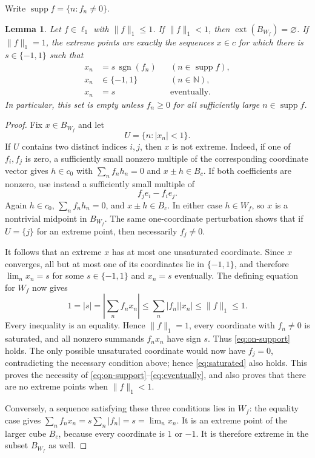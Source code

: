 \documentclass[11pt]{article}
\newtheorem{lemma}[theorem]{Lemma}
\newcommand{\ext}{\operatorname{ext}}
\begin{document}
Write $\operatorname{supp}f=\{n:f_n\ne0\}$.

\begin{lemma}\label{lem:extreme}
Let $f\in\ell_1$ with $\|f\|_1\le1$. If $\|f\|_1<1$, then
$\ext(B_{W_f})=\varnothing$. If $\|f\|_1=1$, the extreme points are exactly
the sequences $x\in c$ for which there is $s\in\{-1,1\}$ such that
\begin{align}
 x_n&=s\,\operatorname{sgn}(f_n)
       &&(n\in\operatorname{supp}f),\label{eq:on-support}\\
 x_n&\in\{-1,1\} &&(n\in\mathbb N),\label{eq:saturated}\\
 x_n&=s &&\text{eventually}.\label{eq:eventually}
\end{align}
In particular, this set is empty unless $f_n\ge0$ for all sufficiently large
$n\in\operatorname{supp}f$.
\end{lemma}

\begin{proof}
Fix $x\in B_{W_f}$ and let
\[
                     U=\{n:|x_n|<1\}.
\]
If $U$ contains two distinct indices $i,j$, then $x$ is not extreme. Indeed,
if one of $f_i,f_j$ is zero, a sufficiently small nonzero multiple of the
corresponding coordinate vector gives $h\in c_0$ with
$\sum_nf_nh_n=0$ and $x\pm h\in B_c$. If both coefficients are nonzero,
use instead a sufficiently small multiple of
\[
                         f_je_i-f_ie_j.
\]
Again $h\in c_0$, $\sum_nf_nh_n=0$, and $x\pm h\in B_c$. In either case
$h\in W_f$, so $x$ is a nontrivial midpoint in $B_{W_f}$. The same
one-coordinate perturbation shows that if $U=\{j\}$ for an extreme point,
then necessarily $f_j\ne0$.

It follows that an extreme $x$ has at most one unsaturated coordinate. Since
$x$ converges, all but at most one of its coordinates lie in $\{-1,1\}$, and
therefore $\lim_nx_n=s$ for some $s\in\{-1,1\}$ and $x_n=s$ eventually.
The defining equation for $W_f$ now gives
\[
 1=|s|=\left|\sum_nf_nx_n\right|
       \le\sum_n|f_n||x_n|\le\|f\|_1\le1.
\]
Every inequality is an equality. Hence $\|f\|_1=1$, every coordinate with
$f_n\ne0$ is saturated, and all nonzero summands $f_nx_n$ have sign $s$.
Thus \eqref{eq:on-support} holds. The only possible unsaturated coordinate
would now have $f_j=0$, contradicting the necessary condition above; hence
\eqref{eq:saturated} also holds. This proves the necessity of
\eqref{eq:on-support}--\eqref{eq:eventually}, and also proves that there are
no extreme points when $\|f\|_1<1$.

Conversely, a sequence satisfying these three conditions lies in $W_f$:
the equality case gives
$\sum_nf_nx_n=s\sum_n|f_n|=s=\lim_nx_n$. It is an extreme point of the
larger cube $B_c$, because every coordinate is $1$ or $-1$. It is therefore
extreme in the subset $B_{W_f}$ as well.
\end{proof}
\end{document}
